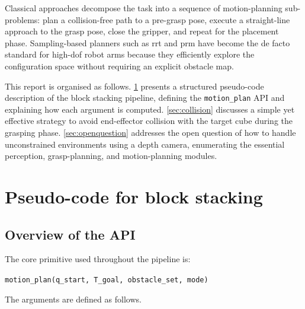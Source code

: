\documentclass{article}
\begin{document}
Classical approaches decompose the task into a sequence of motion-planning sub-problems:
plan a collision-free path to a pre-grasp pose, execute a straight-line approach to the
grasp pose, close the gripper, and repeat for the placement phase.
Sampling-based planners such as \ac{rrt} \citep{lavalle1998rapidly} and \ac{prm}
\citep{kavraki1996probabilistic} have become the de facto standard for high-\ac{dof}
robot arms because they efficiently explore the configuration space without requiring an
explicit obstacle map.

This report is organised as follows.
\cref{sec:pseudocode} presents a structured pseudo-code description of the block stacking
pipeline, defining the \texttt{motion\_plan} API and explaining how each argument is
computed.
\cref{sec:collision} discusses a simple yet effective strategy to avoid end-effector
collision with the target cube during the grasping phase.
\cref{sec:openquestion} addresses the open question of how to handle unconstrained
environments using a depth camera, enumerating the essential perception, grasp-planning,
and motion-planning modules.

\section{Pseudo-code for block stacking}
\label{sec:pseudocode}

\subsection{Overview of the API}

The core primitive used throughout the pipeline is:

\begin{center}
\texttt{motion\_plan(q\_start, T\_goal, obstacle\_set, mode)}
\end{center}

\noindent The arguments are defined as follows.
\end{document}
